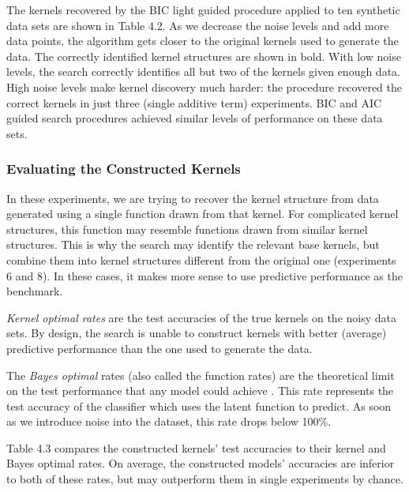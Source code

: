 \documentclass[a4paper,12pt ]{report}
\begin{document}

The kernels recovered by the {BIC light} guided procedure applied to ten synthetic data sets are shown in Table 4.2. As we decrease the noise levels and add more data points, the algorithm gets closer to the original kernels used to generate the data. The correctly identified kernel structures are shown in bold. With low noise levels, the search correctly identifies all but two of the kernels given enough data. High noise levels make kernel discovery much harder: the procedure recovered the correct kernels in just three (single additive term) experiments. BIC and AIC guided search procedures achieved similar levels of performance on these data sets.





\subsubsection*{Evaluating the Constructed Kernels}

In these experiments, we are trying to recover the kernel structure from data generated using a single function drawn from that kernel. For complicated kernel structures, this function may resemble functions drawn from similar kernel structures. This is why the search may identify the relevant base kernels, but combine them into kernel structures different from the original one (experiments 6 and 8). In these cases, it makes more sense to use predictive performance as the benchmark.

\emph{Kernel optimal rates} are the test accuracies of the true kernels on the noisy data sets. By design, the search is unable to construct kernels with better (average) predictive performance than the one used to generate the data.

The \emph{Bayes optimal} rates (also called the function rates) are the theoretical limit on the test performance that any model could achieve  \cite{elementsofstatlearning}. This rate represents the test accuracy of the classifier which uses the latent function to predict. As soon as we introduce noise into the dataset, this rate drops below 100\%.

Table 4.3 compares the constructed kernels' test accuracies to their kernel and Bayes optimal rates. On average, the constructed models' accuracies are inferior to both of these rates, but may outperform them in single experiments by chance.
\end{document}
